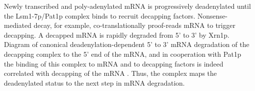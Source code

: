 {
  }{
    Newly transcribed and poly-adenylated mRNA is progressively
    deadenylated until the Lsm1-7p/Pat1p complex binds to recruit
    decapping factors.
    Nonsense-mediated decay, for example, co-translationally
    proof-reads mRNA to trigger decapping.
    A decapped mRNA is rapidly degraded from 5' to 3' by Xrn1p.
  }
  {Diagram of canonical deadenylation-dependent 5' to 3' mRNA degradation}
of the decapping complex to the 5' end of the mRNA, and in
cooperation with Pat1p \parencite{chowdhury2014pat1}
the binding of this
complex to mRNA and to decapping factors is indeed correlated with
decapping of the mRNA 
\parencite{chowdhury2009activation}.
Thus, the complex
maps the deadenylated status to the next step in mRNA degradation.  

